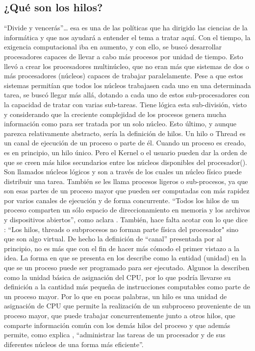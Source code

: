 \documentclass[12pt]{article}
\begin{document}
\begin{multicols}{2}

\section*{¿Qué son los hilos?}
“Divide y vencerás”… esa es una de las políticas que ha dirigido las ciencias de la informática y que nos ayudará a entender el tema a tratar aquí. Con el tiempo, la exigencia computacional iba en aumento, y con ello, se buscó desarrollar procesadores capaces de llevar a cabo más procesos por unidad de tiempo. Esto llevó a crear los procesadores multinúcleo, que no eran más que sistemas de dos o más procesadores (núcleos) capaces de trabajar paralelamente. Pese a que estos sistemas permitían que todos los núcleos trabajasen cada uno en una determinada tarea, se buscó llegar más allá, dotando a cada uno de estos sub-procesadores con la capacidad de tratar con varias sub-tareas. Tiene lógica esta sub-división, visto y considerando que la creciente complejidad de los procesos genera mucha información como para ser tratada por un solo núcleo. Esto último, y aunque parezca relativamente abstracto, sería la definición de hilos. Un hilo o Thread es un canal de ejecución de un proceso o parte de él. Cuando un proceso es creado, es en principio, un hilo único. Pero el Kernel o el usuario pueden dar la orden de que se creen más hilos secundarios entre los núcleos disponibles del procesador(\cite{Reb}).
Son llamados núcleos lógicos y son a través de los cuales un núcleo físico puede distribuir una tarea. También se les llama procesos ligeros o sub-procesos, ya que son esas partes de un proceso mayor que pueden ser computadas con más rapidez por varios canales de ejecución y de forma concurrente. “Todos los hilos de un proceso comparten un sólo espacio de direccionamiento en memoria y los archivos y dispositivos abiertos”, como aclara \cite{Wol}. También, hace falta acotar con lo que dice \cite{Cas}: “Los hilos, threads o subprocesos no forman parte física del procesador" sino que son algo virtual. De hecho la definición de “canal” presentada por al principio, no es más que con el fin de hacer más cómodo el primer vistazo a la idea. La forma en que se presenta en \cite{Mic} los describe como la entidad (unidad) en la que se un proceso puede ser programado para ser ejecutado. Algunos la describen como la unidad básica de asignación del CPU,  por lo que podría llevarse su definición a la cantidad más pequeña de instrucciones computables como parte de un proceso mayor. 
Por lo que en pocas palabras, un hilo es una unidad de asignación de CPU que permite la realización de un subproceso proveniente de un proceso mayor, que puede trabajar concurrentemente junto a otros hilos, que comparte información común con los demás hilos del proceso y que además permite, como explica \cite{Cas}, “administrar las tareas de un procesador y de sus diferentes núcleos de una forma más eficiente”.


\end{multicols}
\end{document}
